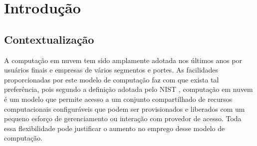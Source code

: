 \chapter{\label{chap:intro}Introdução}




%
%
%
%

\section{Contextualização}

A computação em nuvem tem sido amplamente adotada nos últimos anos por usuários finais e empresas de vários segmentos e portes.
As facilidades proporcionadas por este modelo de computação faz com que exista tal preferência, pois segundo a definição adotada
pelo NIST \cite{Mell:2011}, computação em nuvem é um modelo que permite acesso a um conjunto compartilhado de recursos computacionais configuráveis que podem ser provisionados e liberados  com um pequeno esforço de gerenciamento ou interação com provedor de acesso.
Toda essa flexibilidade pode justificar o aumento no emprego desse modelo de computação.

